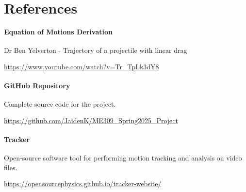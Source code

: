 \section{References}

\paragraph{Equation of Motions Derivation} 

Dr Ben Yelverton - Trajectory of a projectile with linear drag

\href{https://www.youtube.com/watch?v=Tr\_TpLk3dY8}{https://www.youtube.com/watch?v=Tr\_TpLk3dY8}

\paragraph{GitHub Repository} 

Complete source code for the project. 

\href{https://github.com/JaidenK/ME309\_Spring2025\_Project}{https://github.com/JaidenK/ME309\_Spring2025\_Project}

\paragraph{Tracker} 

Open-source software tool for performing motion tracking and analysis on video files.

\href{https://opensourcephysics.github.io/tracker-website/}{https://opensourcephysics.github.io/tracker-website/}